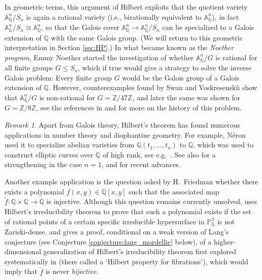 \documentclass[10pt,a4paper]{amsart}
\theoremstyle{plain}
\theoremstyle{remark}
\newtheorem{remark}[theorem]{Remark}
\numberwithin{theorem}{section}
\begin{document}
In geometric terms, this argument of Hilbert exploits that the quotient variety $\mathbb{A}^n_\mathbb{Q}/S_n$ is again a rational variety (i.e., birationally equivalent to $\mathbb{A}^n_\mathbb{Q}$), in fact $\mathbb{A}^n_\mathbb{Q}/S_n\cong\mathbb{A}^n_\mathbb{Q}$, so that the Galois cover $\mathbb{A}^n_\mathbb{Q}\rightarrow\mathbb{A}^n_\mathbb{Q}/S_n$ can be specialized to a Galois extension of $\mathbb{Q}$ with the same Galois group.
(We will return to this geometric interpretation in Section \ref{sec:HP}.)
In what became known as the {\em Noether program},
Emmy Noether \cite{Noether} started the investigation of whether 
$\mathbb{A}^n_\mathbb{Q}/G$ is rational for all finite groups $G\leq S_n$, 
which if true would give a strategy to solve the inverse Galois problem:
Every finite group $G$ would be the Galois group of a Galois extension of $\mathbb{Q}$.
However, counterexamples found by Swan \cite{Swan} and Voskresenski\u{\i} \cite{Voskresenskii} 
show that $\mathbb{A}^n_\mathbb{Q}/G$ is non-rational for  $G=\mathbb{Z}/47\mathbb{Z}$,
and later the same was shown for    $G=\mathbb{Z}/8\mathbb{Z}$, see the references in \cite{Lenstra} and \cite[\S 1.6.1]{WittenbergPark} for more on the history of this problem. 


\begin{remark}
Apart from Galois theory, Hilbert's theorem has found numerous applications in number theory and diophantine geometry.
For example, N\'eron \cite{Neron} used it to specialize abelian varieties from $\mathbb{Q}(t_1,\dots,t_n)$ to $\mathbb{Q}$, which was used to construct elliptic curves over $\mathbb{Q}$ of high rank,
see e.g.~\cite[Chapter 11]{Serre_MW}.
See also \cite{Silverman_specialization} for a strengthening in the case $n=1$,
and \cite{CT,LS,CS} for recent advances. 

Another example application
is the question
asked by H.~Friedman 
whether there exists a polynomial $f(x,y)\in \mathbb{Q}[x,y]$ such that the associated map $\tilde{f}\colon\mathbb{Q}\times \mathbb{Q}\to \mathbb{Q}$ is injective. 
Although this question remains currently unsolved, \cite[Theorem~1.1]{Poo10} uses Hilbert's irreducibility theorem to prove that such a polynomial exists if
the set of rational points of
a certain specific irreducible hypersurface in $\mathbb{P}^3_\mathbb{Q}$ 
is not Zariski-dense,
and \cite{Bre21} 
gives a proof,
conditional on a weak version of Lang's conjecture (see Conjecture \ref{conjecture:lang_mordellic} below),
of a   higher-dimensional generalization of Hilbert's irreducibility theorem first explored systematically in \cite[Section 3.8.1]{CZbook} (there called a `Hilbert property for fibrations'), which would imply that $\tilde{f}$ is never {\em bijective}.
\end{remark}
\end{document}
